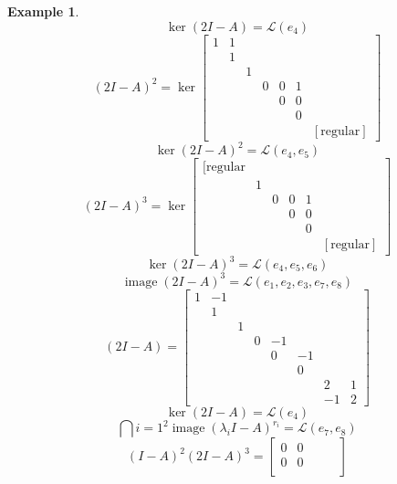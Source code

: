 \documentclass{article}
\newtheorem{example}{Example}  \numberwithin{example}{section}
\DeclareMathOperator{\im}{image}
\begin{document}
\begin{example}
\[  \] \[
    \ker(2I - A) = \mathcal L(e_{4})
  \] \[
    (2I - A)^2 = \ker\begin{bmatrix}
      1 & 1  &   &    &    &    &     \\   %
        & 1  &   &    &    &    &     \\   %
        &    & 1 &    &    &    &     \\
        &    &   & 0  & 0  & 1  &     \\
        &    &   &    & 0  & 0  &     \\
        &    &   &    &    & 0  &     \\
        &    &   &    &    &    & [\text{regular}]
    \end{bmatrix}
  \] \[
    \ker(2I - A)^2 = \mathcal L(e_4, e_5)
  \] \[
    (2I - A)^3 = \ker\begin{bmatrix}
      [\text{regular}  &   &    &    &    &     \\
            & 1 &    &    &    &     \\
            &   & 0  & 0  & 1  &     \\
            &   &    & 0  & 0  &     \\
            &   &    &    & 0  &     \\
            &   &    &    &    & [\text{regular}]
    \end{bmatrix}
  \] \[
    \ker(2I - A)^3 = \mathcal L(e_4, e_5, e_6)
  \] \[
    \im(2I - A)^3 = \mathcal L(e_1, e_2, e_3, e_7, e_8)
  \] \[
    (2I - A) = \begin{bmatrix}
      1 & -1 &   &   &    &    &    & \\
        & 1  &   &   &    &    &    & \\
        &    & 1 &   &    &    &    & \\
        &    &   & 0 & -1 &    &    & \\
        &    &   &   & 0  & -1 &    & \\
        &    &   &   &    & 0  &    & \\
        &    &   &   &    &    & 2  & 1 \\
        &    &   &   &    &    & -1 & 2
    \end{bmatrix}
  \] \[
    \ker(2I - A) = \mathcal L(e_4)
  \] \[
    \bigcap{i=1}^2 \im(\lambda_i I - A)^{r_i} = \mathcal L(e_7, e_8)
  \] \[
    (I - A)^2 (2I - A)^3 = \begin{bmatrix}
      0 & 0 &   & & \\
      0 & 0 &   & & \\

\end{bmatrix}\]
\end{example}
\end{document}
